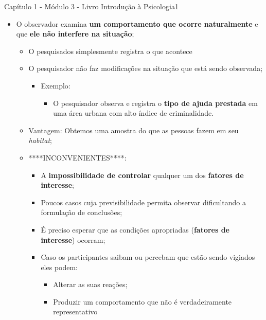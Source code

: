 \documentclass[
]{book}
\providecommand{\tightlist}{%
  \setlength{\itemsep}{0pt}\setlength{\parskip}{0pt}}
\begin{document}
Capítulo 1 - Módulo 3 - Livro Introdução à Psicologia1

\begin{itemize}
\tightlist
\item
  O observador examina \textbf{um comportamento que ocorre naturalmente} e que \textbf{ele não interfere na situação};

  \begin{itemize}
  \tightlist
  \item
    O pesquisados simplesmente registra o que acontece
  \item
    O pesquisador não faz modificações na situação que está sendo observada;

    \begin{itemize}
    \tightlist
    \item
      Exemplo:

      \begin{itemize}
      \tightlist
      \item
        O pesquisador observa e registra o \textbf{tipo de ajuda prestada} em uma área urbana com alto índice de criminalidade.
      \end{itemize}
    \end{itemize}
  \item
    Vantagem: Obtemos uma amostra do que as pessoas fazem em seu \emph{habitat};
  \item
    ****INCONVENIENTES****:

    \begin{itemize}
    \tightlist
    \item
      A \textbf{impossibilidade de controlar} qualquer um dos \textbf{fatores de interesse};
    \item
      Poucos casos cuja previsibilidade permita observar dificultando a formulação de conclusões;
    \item
      É preciso esperar que as condições apropriadas (\textbf{fatores de interesse}) ocorram;
    \item
      Caso os participantes saibam ou percebam que estão sendo vigiados eles podem:

      \begin{itemize}
      \tightlist
      \item
        Alterar as suas reações;
      \item
        Produzir um comportamento que não é verdadeiramente representativo
      \end{itemize}
    \end{itemize}
  \end{itemize}
\end{itemize}
\end{document}
